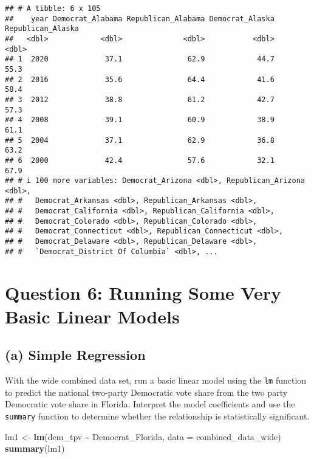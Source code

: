 \documentclass[
]{article}
\newenvironment{Shaded}{\begin{snugshade}}{\end{snugshade}}
\newcommand{\AttributeTok}[1]{\textcolor[rgb]{0.13,0.29,0.53}{#1}}
\newcommand{\FunctionTok}[1]{\textcolor[rgb]{0.13,0.29,0.53}{\textbf{#1}}}
\newcommand{\NormalTok}[1]{#1}
\newcommand{\OtherTok}[1]{\textcolor[rgb]{0.56,0.35,0.01}{#1}}
\newcommand{\SpecialCharTok}[1]{\textcolor[rgb]{0.81,0.36,0.00}{\textbf{#1}}}
\begin{document}
\begin{verbatim}
## # A tibble: 6 x 105
##    year Democrat_Alabama Republican_Alabama Democrat_Alaska Republican_Alaska
##   <dbl>            <dbl>              <dbl>           <dbl>             <dbl>
## 1  2020             37.1               62.9            44.7              55.3
## 2  2016             35.6               64.4            41.6              58.4
## 3  2012             38.8               61.2            42.7              57.3
## 4  2008             39.1               60.9            38.9              61.1
## 5  2004             37.1               62.9            36.8              63.2
## 6  2000             42.4               57.6            32.1              67.9
## # i 100 more variables: Democrat_Arizona <dbl>, Republican_Arizona <dbl>,
## #   Democrat_Arkansas <dbl>, Republican_Arkansas <dbl>,
## #   Democrat_California <dbl>, Republican_California <dbl>,
## #   Democrat_Colorado <dbl>, Republican_Colorado <dbl>,
## #   Democrat_Connecticut <dbl>, Republican_Connecticut <dbl>,
## #   Democrat_Delaware <dbl>, Republican_Delaware <dbl>,
## #   `Democrat_District Of Columbia` <dbl>, ...
\end{verbatim}

\section{Question 6: Running Some Very Basic Linear
Models}\label{question-6-running-some-very-basic-linear-models}

\subsection{(a) Simple Regression}\label{a-simple-regression}

With the wide combined data set, run a basic linear model using the
\texttt{lm} function to predict the national two-party Democratic vote
share from the two party Democratic vote share in Florida. Interpret the
model coefficients and use the \texttt{summary} function to determine
whether the relationship is statistically significant.

\begin{Shaded}
\begin{Highlighting}[]
\NormalTok{lm1 }\OtherTok{\textless{}{-}} \FunctionTok{lm}\NormalTok{(dem\_tpv }\SpecialCharTok{\textasciitilde{}}\NormalTok{ Democrat\_Florida, }\AttributeTok{data =}\NormalTok{ combined\_data\_wide)}
\FunctionTok{summary}\NormalTok{(lm1)}
\end{Highlighting}
\end{Shaded}
\end{document}
